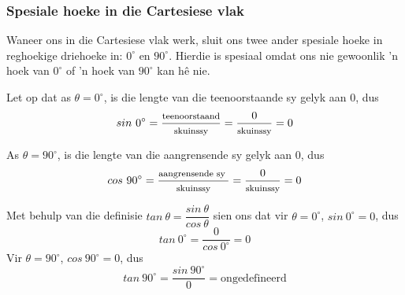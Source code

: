 \subsubsection{Spesiale hoeke in die Cartesiese vlak}
Waneer ons in die Cartesiese vlak werk, sluit ons twee ander spesiale hoeke in reghoekige driehoeke in:  $0^{\circ}$ en $90^{\circ}$. Hierdie is spesiaal omdat ons nie gewoonlik 'n hoek van $0^{\circ}$ of 'n hoek van $90^{\circ}$ kan hê nie.

Let op dat as $\theta = 0^{\circ}$, is die lengte van die teenoorstaande sy gelyk aan $0$, dus
\begin{equation*}
  sin~ 0^{\circ} =
  \dfrac{\mbox{\footnotesize teenoorstaand}}{\mbox{\footnotesize skuinssy}} =
  \dfrac{0}{\mbox{\footnotesize skuinssy}} =
  0
\end{equation*}

As $\theta = 90^{\circ}$, is die lengte van die aangrensende sy gelyk aan $0$, dus
\begin{equation*}
  cos~ 90^{\circ} =
  \dfrac{\mbox{\footnotesize aangrensende sy }}{\mbox{\footnotesize skuinssy}} =
  \dfrac{0}{\mbox{\footnotesize skuinssy}} =
  0
\end{equation*}

Met behulp van die definisie $tan~ \theta=\dfrac{sin~ \theta}{cos~ \theta}$ sien ons dat vir
$\theta =  0^{\circ}$, $sin~ 0^{\circ}=0$, dus
\begin{equation*}
  tan~ 0^{\circ} =
  \dfrac{0}{cos~ 0^{\circ}} =
  0
\end{equation*}
Vir $\theta =  90^{\circ}$, $cos~ 90^{\circ}=0$, dus
\begin{equation*}
  tan~ 90^{\circ} =
  \dfrac{sin~ 90^{\circ}}{0} =
  \mbox{ongedefineerd}
\end{equation*}

